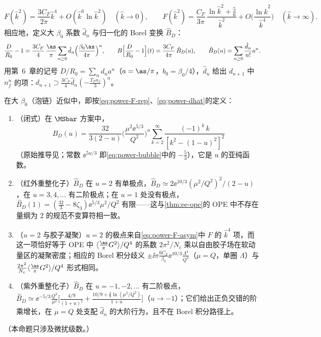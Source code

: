\begin{equation}\label{eq:power-F-asym}
F(\hat k^2)=\frac{3C_F}{2\pi}\hat k^4+O(\hat k^6\ln\hat k^2)\quad(\hat k\to0),\qquad
F(\hat k^2)=\frac{C_F}{3\pi}\,\frac{\ln\hat k^2+\frac56}{\hat k^2}+O\Big(\frac{\ln\hat k^2}{\hat k^4}\Big)\quad(\hat k\to\infty).
\end{equation}
相应地，定义大 $\beta_0$ 系数 $\hat d_n$ 与归一化的 Borel 变换 $\hat B_D$：
\begin{equation}\label{eq:power-dhat}
\frac{D}{R_0}-1=\frac{3C_F}{4}\,\frac{\as}{\pi}\sum_{n\ge0}\hat d_n\Big(\frac{\beta_0\as}{4\pi}\Big)^n,\qquad
B\Big[\frac{D}{R_0}-1\Big](t)=\frac{3C_F}{4\pi}\,\hat B_D(u),\qquad \hat B_D(u)=\sum_{n\ge0}\frac{\hat d_n}{n!}u^n .
\end{equation}
用第~6~章的记号 $D/R_0=\sum_nd_na^n$（$a=\as/\pi$，$b_0=\beta_0/4$），$\hat d_n$ 给出 $d_{n+1}$ 中 $n_f^n$ 的项：$d_{n+1}\supset\frac{3C_F}{4}\hat d_n(-\frac{T_Fn_f}{3})^n$。


\begin{proposition}\label{prop:power-adler-large-beta0}
在大 $\beta_0$（泡链）近似中，即按\eqref{eq:power-F-rep}、\eqref{eq:power-dhat}的定义：
\begin{enumerate}[label=(\alph*),leftmargin=2em,itemsep=1pt,topsep=2pt]
\item（闭式）在 $\MSbar$ 方案中，
\begin{equation}\label{eq:power-adler-borel}
\hat B_D(u)=\frac{32}{3(2-u)}\Big(\frac{\mu^2\ee^{5/3}}{Q^2}\Big)^{u}\sum_{k=2}^\infty\frac{(-1)^k\,k}{[k^2-(1-u)^2]^2}
\end{equation}
\cite[式~(5.10)]{Beneke1999}（原始推导见\cite{Beneke1993,Broadhurst1993}；常数 $\ee^{5u/3}$ 即\eqref{eq:power-bubble}中的 $-\frac53$），它是 $u$ 的亚纯函数。
\item（红外重整化子）$\hat B_D$ 在 $u=2$ 有单极点，$\hat B_D\simeq2\ee^{10/3}(\mu^2/Q^2)^2/(2-u)$，在 $u=3,4,\dots$ 有二阶极点；在 $u=1$ 处没有极点，$\hat B_D(1)=(\frac{32}{3}-8\zeta_3)\ee^{5/3}\mu^2/Q^2$ 有限——这与\cref{thm:ee-ope}的 OPE 中不存在量纲为 2 的规范不变算符相一致。
\item（$u=2$ 与胶子凝聚）$u=2$ 的极点来自\eqref{eq:power-F-asym}中 $F$ 的 $\hat k^4$ 项，而这一项恰好等于 OPE 中 $\langle\frac{\as}{\pi}G^2\rangle/Q^4$ 的系数 $2\pi^2/N_c$ 乘以自由胶子场在软动量区的凝聚密度；相应的 Borel 积分歧义 $\pm\ii\pi\frac{6C_F}{\beta_0}\ee^{10/3}\frac{\Lambda^4}{Q^4}$（$\mu=Q$，单圈 $\Lambda$）与 $\frac{2\pi^2}{N_c}\langle\frac{\as}{\pi}G^2\rangle/Q^4$ 形式相同。
\item（紫外重整化子）$\hat B_D$ 在 $u=-1,-2,\dots$ 有二阶极点，$\hat B_D\simeq\ee^{-5/3}\frac{Q^2}{\mu^2}\big[\frac{4/9}{(1+u)^2}+\frac{10/9+\frac49\ln(\mu^2/Q^2)}{1+u}\big]$（$u\to-1$）；它们给出正负交错的阶乘增长，在 $\mu=Q$ 处支配 $\hat d_n$ 的大阶行为，且不在 Borel 积分路径上。
\end{enumerate}
（本命题只涉及微扰级数。）
\end{proposition}

